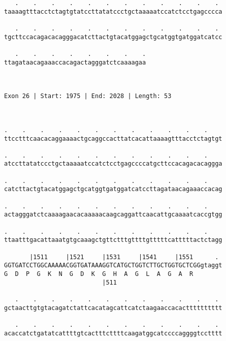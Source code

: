 \documentclass{article}
\begin{document}
\begin{Verbatim}
   .    .    .    .    .    .    .    .    .    .    .    . 
taaaagtttacctctagtgtatccttatatccctgctaaaaatccatctcctgagcccca
                                                            
   .    .    .    .    .    .    .    .    .    .    .    . 
tgcttccacagacacagggacatcttactgtacatggagctgcatggtgatggatcatcc
                                                            
   .    .    .    .    .    .    .    .
ttagataacagaaaccacagactagggatctcaaaagaa
                                       
                                       
 
Exon 26 | Start: 1975 | End: 2028 | Length: 53



.    .    .    .    .    .    .    .    .    .    .    .    
ttcctttcaacacaggaaaactgcaggccacttatcacattaaaagtttacctctagtgt
                                                            
.    .    .    .    .    .    .    .    .    .    .    .    
atccttatatccctgctaaaaatccatctcctgagccccatgcttccacagacacaggga
                                                            
.    .    .    .    .    .    .    .    .    .    .    .    
catcttactgtacatggagctgcatggtgatggatcatccttagataacagaaaccacag
                                                            
.    .    .    .    .    .    .    .    .    .    .    .    
actagggatctcaaaagaacacaaaaacaagcaggattcaacattgcaaaatcaccgtgg
                                                            
.    .    .    .    .    .    .    .    .    .    .    .    
ttaatttgacattaaatgtgcaaagctgttctttgttttgtttttcatttttactctagg
                                                            
       |1511     |1521     |1531     |1541     |1551      . 
GGTGATCCTGGCAAAAACGGTGATAAAGGTCATGCTGGTCTTGCTGGTGCTCGGgtaggt
G  D  P  G  K  N  G  D  K  G  H  A  G  L  A  G  A  R        
                           |511                             
  
   .    .    .    .    .    .    .    .    .    .    .    . 
gctaacttgtgtacagatctattcacatagcattcatctaagaaccacactttttttttt
                                                            
   .    .    .    .    .    .    .    .    .    .    .    . 
acaccatctgatatcattttgtcactttcttttcaagatggcatccccaggggtcctttt
                                                            

\end{Verbatim}
\end{document}
